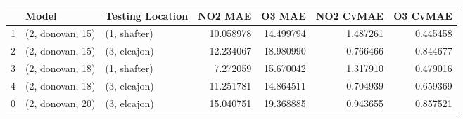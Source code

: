 \begin{tabular}{lllrrrr}
\toprule
{} &             Model & Testing Location &    NO2 MAE &     O3 MAE &  NO2 CvMAE &  O3 CvMAE \\
\midrule
1 &  (2, donovan, 15) &     (1, shafter) &  10.058978 &  14.499794 &   1.487261 &  0.445458 \\
2 &  (2, donovan, 15) &     (3, elcajon) &  12.234067 &  18.980990 &   0.766466 &  0.844677 \\
3 &  (2, donovan, 18) &     (1, shafter) &   7.272059 &  15.670042 &   1.317910 &  0.479016 \\
4 &  (2, donovan, 18) &     (3, elcajon) &  11.251781 &  14.864511 &   0.704939 &  0.659369 \\
0 &  (2, donovan, 20) &     (3, elcajon) &  15.040751 &  19.368885 &   0.943655 &  0.857521 \\
\bottomrule
\end{tabular}
